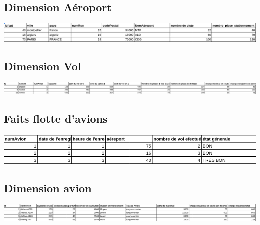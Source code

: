 \documentclass[oneside,13pt,a4paper]{article}
\begin{document}
\subsection{Dimension Aéroport}


  
  \includegraphics[width=1\textwidth]{img/aereport.png}
  


\subsection{Dimension Vol}


  
  \includegraphics[width=1\textwidth]{img/vol.png}
  




\subsection{Faits flotte d'avions}

  
  \includegraphics[width=1\textwidth]{img/flottedavions.png}
  


\subsection{Dimension avion}


  
  \includegraphics[width=1\textwidth]{img/avion.png}
  
\end{document}
